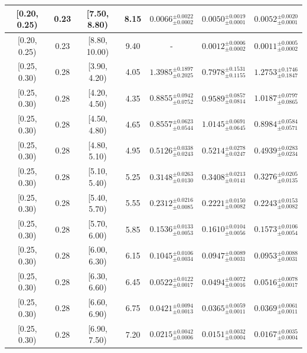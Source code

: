 \begin{longtable}{|c|c|c|c|c|c|c|}
[0.20, 0.25) & 0.23 & [7.50, 8.80) & 8.15 & $0.0066^{ \pm 0.0022 }_{ \pm 0.0002 }$ & $0.0050^{ \pm 0.0019 }_{ \pm 0.0001 }$ & $0.0052^{ \pm 0.0020 }_{ \pm 0.0001 }$ \\ 
\hline
[0.20, 0.25) & 0.23 & [8.80, 10.00) & 9.40 & - & $0.0012^{ \pm 0.0006 }_{ \pm 0.0002 }$ & $0.0011^{ \pm 0.0005 }_{ \pm 0.0002 }$ \\ 
\hline
[0.25, 0.30) & 0.28 & [3.90, 4.20) & 4.05 & $1.3985^{ \pm 0.1897 }_{ \pm 0.2025 }$ & $0.7978^{ \pm 0.1531 }_{ \pm 0.1155 }$ & $1.2753^{ \pm 0.1746 }_{ \pm 0.1847 }$ \\ 
\hline
[0.25, 0.30) & 0.28 & [4.20, 4.50) & 4.35 & $0.8855^{ \pm 0.0942 }_{ \pm 0.0752 }$ & $0.9589^{ \pm 0.0857 }_{ \pm 0.0814 }$ & $1.0187^{ \pm 0.0797 }_{ \pm 0.0865 }$ \\ 
\hline
[0.25, 0.30) & 0.28 & [4.50, 4.80) & 4.65 & $0.8557^{ \pm 0.0623 }_{ \pm 0.0544 }$ & $1.0145^{ \pm 0.0691 }_{ \pm 0.0645 }$ & $0.8984^{ \pm 0.0584 }_{ \pm 0.0571 }$ \\ 
\hline
[0.25, 0.30) & 0.28 & [4.80, 5.10) & 4.95 & $0.5126^{ \pm 0.0338 }_{ \pm 0.0243 }$ & $0.5214^{ \pm 0.0278 }_{ \pm 0.0247 }$ & $0.4939^{ \pm 0.0283 }_{ \pm 0.0234 }$ \\ 
\hline
[0.25, 0.30) & 0.28 & [5.10, 5.40) & 5.25 & $0.3148^{ \pm 0.0263 }_{ \pm 0.0130 }$ & $0.3408^{ \pm 0.0213 }_{ \pm 0.0141 }$ & $0.3276^{ \pm 0.0205 }_{ \pm 0.0135 }$ \\ 
\hline
[0.25, 0.30) & 0.28 & [5.40, 5.70) & 5.55 & $0.2312^{ \pm 0.0216 }_{ \pm 0.0085 }$ & $0.2221^{ \pm 0.0150 }_{ \pm 0.0082 }$ & $0.2243^{ \pm 0.0153 }_{ \pm 0.0082 }$ \\ 
\hline
[0.25, 0.30) & 0.28 & [5.70, 6.00) & 5.85 & $0.1536^{ \pm 0.0133 }_{ \pm 0.0053 }$ & $0.1610^{ \pm 0.0104 }_{ \pm 0.0056 }$ & $0.1573^{ \pm 0.0106 }_{ \pm 0.0054 }$ \\ 
\hline
[0.25, 0.30) & 0.28 & [6.00, 6.30) & 6.15 & $0.1045^{ \pm 0.0106 }_{ \pm 0.0034 }$ & $0.0947^{ \pm 0.0089 }_{ \pm 0.0031 }$ & $0.0953^{ \pm 0.0088 }_{ \pm 0.0031 }$ \\ 
\hline
[0.25, 0.30) & 0.28 & [6.30, 6.60) & 6.45 & $0.0522^{ \pm 0.0122 }_{ \pm 0.0017 }$ & $0.0494^{ \pm 0.0072 }_{ \pm 0.0016 }$ & $0.0516^{ \pm 0.0078 }_{ \pm 0.0017 }$ \\ 
\hline
[0.25, 0.30) & 0.28 & [6.60, 6.90) & 6.75 & $0.0421^{ \pm 0.0094 }_{ \pm 0.0013 }$ & $0.0365^{ \pm 0.0059 }_{ \pm 0.0011 }$ & $0.0369^{ \pm 0.0061 }_{ \pm 0.0011 }$ \\ 
\hline
[0.25, 0.30) & 0.28 & [6.90, 7.50) & 7.20 & $0.0215^{ \pm 0.0042 }_{ \pm 0.0006 }$ & $0.0151^{ \pm 0.0032 }_{ \pm 0.0004 }$ & $0.0167^{ \pm 0.0035 }_{ \pm 0.0004 }$ \\ 

\end{longtable}
